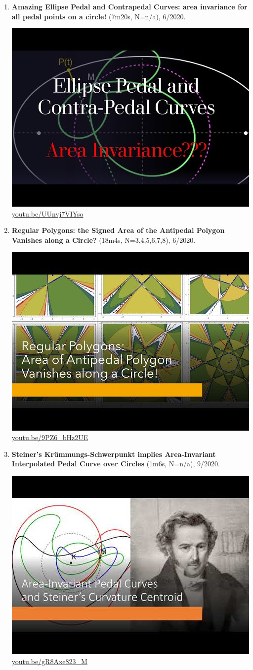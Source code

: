 \documentclass[12pt]{amsart}
\begin{document}
\begin{enumerate}[resume]
\item \textbf{Amazing Ellipse Pedal and Contrapedal Curves: area invariance for all pedal points on a circle!} (7m20s, N=n/a), 6/2020. 
\begin{center}\includegraphics[width=.5\textwidth]{pics/UUnvj7VIYso.jpg} \\ 
\href{https://youtu.be/UUnvj7VIYso}{\url{youtu.be/UUnvj7VIYso}}\end{center}
% 
\item \textbf{Regular Polygons: the Signed Area of the Antipedal Polygon Vanishes along a Circle?} (18m4s, N=3,4,5,6,7,8), 6/2020. 
\begin{center}\includegraphics[width=.5\textwidth]{pics/9PZ6_bHz2UE.jpg} \\ 
\href{https://youtu.be/9PZ6_bHz2UE}{\url{youtu.be/9PZ6\_bHz2UE}}\end{center}
% 
\item \textbf{Steiner's Krümmungs-Schwerpunkt implies Area-Invariant Interpolated Pedal Curve over Circles} (1m6s, N=n/a), 9/2020. 
\begin{center}\includegraphics[width=.5\textwidth]{pics/gR8Axe823_M.jpg} \\ 
\href{https://youtu.be/gR8Axe823_M}{\url{youtu.be/gR8Axe823\_M}}\end{center}
% 
\end{enumerate}
\end{document}
